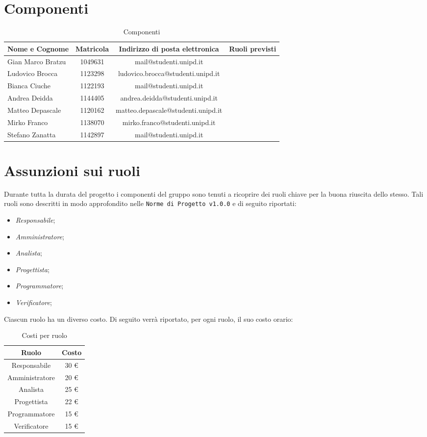 \section{Componenti}
	\begin{table}[htp]
		\centering
		\caption{Componenti}
		\begin{tabularx}{\textwidth}{|X|c|c|X|}
			\hline
			\textbf{Nome e Cognome} & \textbf{Matricola} & \textbf{Indirizzo di posta elettronica} & \textbf{Ruoli previsti} \\
			\hline 
			Gian Marco Bratzu & 1049631 & mail@studenti.unipd.it & \\
			\hline
			Ludovico Brocca & 1123298 & ludovico.brocca@studenti.unipd.it & \\
			\hline
			Bianca Ciuche & 1122193 & mail@studenti.unipd.it & \\
			\hline
			Andrea Deidda & 1144405 & andrea.deidda@studenti.unipd.it & \\
			\hline
			Matteo Depascale & 1120162 & matteo.depascale@studenti.unipd.it & \\
			\hline
			Mirko Franco & 1138070 &  mirko.franco@studenti.unipd.it & \\
			\hline
			Stefano Zanatta & 1142897 & mail@studenti.unipd.it & \\
			\hline
		\end{tabularx}
	\end{table}
\section{Assunzioni sui ruoli}
	Durante tutta la durata del progetto i componenti del gruppo sono tenuti a ricoprire dei ruoli chiave per la buona riuscita dello stesso.
	Tali ruoli sono descritti in modo approfondito nelle \texttt{Norme di Progetto v1.0.0} e di seguito riportati:
	\begin{itemize}
		\item \textit{Responsabile};
		\item \textit{Amministratore};
		\item \textit{Analista};
		\item \textit{Progettista};
		\item \textit{Programmatore};
		\item \textit{Verificatore};
	\end{itemize}
	Ciascun ruolo ha un diverso costo. Di seguito verrà riportato, per ogni ruolo, il suo costo orario:
	\begin{table}[htp]
		\centering
		\caption{Costi per ruolo}
		\begin{tabular}{|c|c|}
			\hline
			\textbf{Ruolo} & \textbf{Costo} \\
			\hline
			Responsabile & 30 \euro \\
			Amministratore & 20 \euro \\
			Analista & 25 \euro \\
			Progettista & 22 \euro \\
			Programmatore & 15 \euro \\
			Verificatore & 15 \euro \\
			\hline
		\end{tabular}
	\end{table}